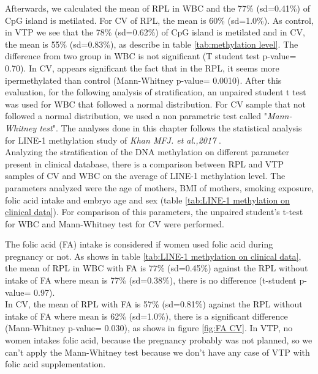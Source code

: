 \documentclass[journal,article,submit,moreauthors,pdftex]{Definitions/mdpi}
\begin{document}
\noindent Afterwards, we calculated the mean of RPL in WBC and the 77\% (sd=0.41\%) of CpG island is metilated. For CV of RPL, the mean is 60\% (sd=1.0\%). As control, in VTP we see that the 78\% (sd=0.62\%) of CpG island is metilated and in CV, the mean is 55\% (sd=0.83\%), as describe in table \ref{tab:methylation level}. The difference from two group in WBC is not significant (T student test p-value= 0.70). In CV, appears significant the fact that in the RPL, it seems more ipermethylated than control (Mann-Whitney p-value= 0.0010). %
\noindent After this evaluation, for the following analysis of stratification, an unpaired student t test was used for WBC that followed a normal distribution. For CV sample that not followed a normal distribution, we used a non parametric test called "\textit{Mann-Whitney test}". The analyses done in this chapter follows the statistical analysis for LINE-1 methylation study of \textit{Khan MFJ. et al.,2017} \cite{khan2018evaluating}. \\

\noindent Analyzing the stratification of the DNA methylation on different parameter present in clinical database, there is a comparison between RPL and VTP samples of CV and WBC on the average of LINE-1 methylation level. The parameters analyzed were the age of mothers, BMI of mothers, smoking exposure, folic acid intake and embryo age and sex (table \ref{tab:LINE-1 methylation on clinical data}). For comparison of this parameters, the unpaired student’s t-test for WBC and Mann-Whitney test for CV were performed.  

\noindent The folic acid (FA) intake is considered if women used folic acid during pregnancy or not. As shows in table \ref{tab:LINE-1 methylation on clinical data}, the mean of RPL in WBC with FA is 77\% (sd=0.45\%) against the RPL without intake of FA where mean is 77\% (sd=0.38\%), there is no difference (t-student p-value= 0.97). \\

\noindent In CV, the mean of RPL with FA is 57\% (sd=0.81\%) against the RPL without intake of FA where mean is 62\% (sd=1.0\%), there is a significant difference (Mann-Whitney p-value= 0.030), as shows in figure \ref{fig:FA CV}. In VTP, no women intakes folic acid, because the pregnancy probably was not planned, so we can't apply the Mann-Whitney test because we don't have any case of VTP with folic acid supplementation.
\end{document}
